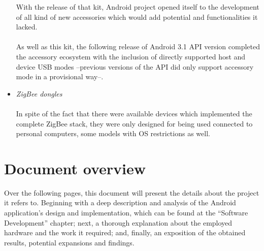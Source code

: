 \begin{itemize}
				With the release of that kit, Android project opened itself to the development
				of all kind of new accessories which would add potential and functionalities
				it lacked.\\\\
				As well as this kit, the following release of Android 3.1 API version completed
				the accessory ecosystem with the inclusion of directly supported host and device
				USB modes --previous versions of the API did only support accessory mode in a 
				provisional way--.\\
			\item \emph{ZigBee dongles}\\\\
				In spite of the fact that there were available devices which implemented the complete ZigBee stack,
				they were only designed for being used connected to personal computers, some models with OS 
				restrictions as well.\\
		\end{itemize}
	
		
	
	\section{Document overview}
		Over the following pages, this document will present the details about the project it refers to.
		Beginning with a deep description and analysis of the Android application's design and implementation,
		which can be found at the ``Software Development'' chapter; next, a thorough explanation about the
		employed hardware and the work it required; and, finally, an exposition of the obtained results,
		potential expansions and findings.  

		



